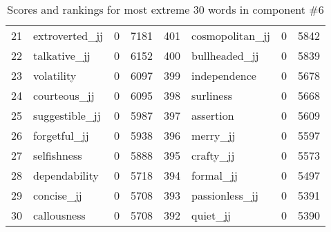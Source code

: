 \begin{table}[tbp]
\begin{tabular}{| rlr@{.}l | rlr@{.}l |}
    21 & extroverted\_jj & 0 & 7181    &    401 & cosmopolitan\_jj & 0 & 5842 \\
    22 & talkative\_jj & 0 & 6152    &    400 & bullheaded\_jj & 0 & 5839 \\
    23 & volatility & 0 & 6097    &    399 & independence & 0 & 5678 \\
    24 & courteous\_jj & 0 & 6095    &    398 & surliness & 0 & 5668 \\
    25 & suggestible\_jj & 0 & 5987    &    397 & assertion & 0 & 5609 \\
    26 & forgetful\_jj & 0 & 5938    &    396 & merry\_jj & 0 & 5597 \\
    27 & selfishness & 0 & 5888    &    395 & crafty\_jj & 0 & 5573 \\
    28 & dependability & 0 & 5718    &    394 & formal\_jj & 0 & 5497 \\
    29 & concise\_jj & 0 & 5708    &    393 & passionless\_jj & 0 & 5391 \\
    30 & callousness & 0 & 5708    &    392 & quiet\_jj & 0 & 5390 \\
    \hline
    \end{tabular}
    \caption{Scores and rankings for most extreme 30 words in component \#6} 
\end{table}
\clearpage
